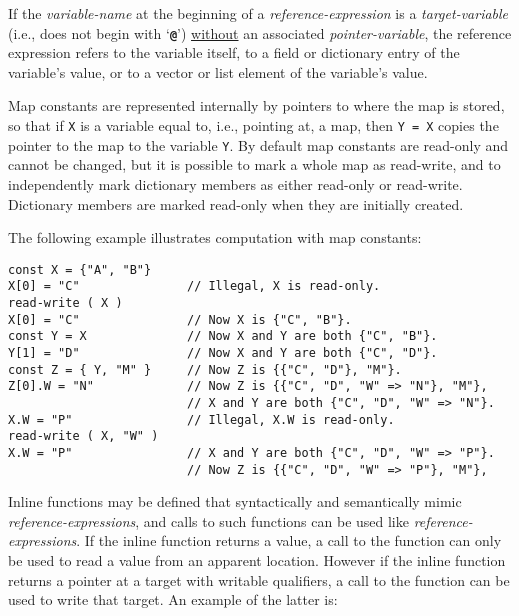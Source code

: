 \documentclass[12pt]{article}
\newcommand{\TT}[1]{{\tt \bfseries #1}}
\newcommand{\EOL}{\penalty \exhyphenpenalty}
\newenvironment{indpar}[1][0.3in]%
	{\begin{list}{}%
		     {\setlength{\itemsep}{0in}%
		      \setlength{\topsep}{0in}%
		      \setlength{\parsep}{1ex}%
		      \setlength{\labelwidth}{#1}%
		      \setlength{\leftmargin}{#1}%
		      \addtolength{\leftmargin}{\labelsep}}%
	 \item}%
	{\end{list}}
\begin{document}
If the {\em variable-name} at the beginning of a {\em reference-expression}
is a {\em target-variable} (i.e., does not begin with `\TT{@}')
\underline{without}
an associated {\em pointer-variable},
the reference expression refers to the variable itself,
to a field or dictionary entry of the variable's value,
or to a vector or list element of the variable's value.

Map constants are represented internally by pointers to where
the map is stored, so that if {\tt X} is a variable equal to,
i.e., pointing at, a map, then {\tt Y = X} copies the pointer
to the map to the variable {\tt Y}.  By default map constants
are read-only and cannot be changed, but it is possible to mark
a whole map as read-write, and to independently mark dictionary members
as either read-only or read-write.
Dictionary members are marked read-only when they are initially created.

The following example illustrates
computation with map constants:
\begin{indpar}\begin{verbatim}
const X = {"A", "B"}
X[0] = "C"               // Illegal, X is read-only.
read-write ( X )
X[0] = "C"               // Now X is {"C", "B"}.
const Y = X              // Now X and Y are both {"C", "B"}. 
Y[1] = "D"               // Now X and Y are both {"C", "D"}. 
const Z = { Y, "M" }     // Now Z is {{"C", "D"}, "M"}.
Z[0].W = "N"             // Now Z is {{"C", "D", "W" => "N"}, "M"},
                         // X and Y are both {"C", "D", "W" => "N"}.
X.W = "P"                // Illegal, X.W is read-only.
read-write ( X, "W" )
X.W = "P"                // X and Y are both {"C", "D", "W" => "P"}.
                         // Now Z is {{"C", "D", "W" => "P"}, "M"},
\end{verbatim}\end{indpar}


Inline functions may be defined that syntactically and semantically mimic
{\em reference-\EOL expres\-sions}, and calls to such functions
can be used like {\em reference-expressions}.
If the inline function returns a value, a call to the function
can only be used to read a value from an apparent
location.  However if the inline function returns a pointer at a target
with writable qualifiers, a call to the function can be used
to write that target.  An example of the latter is:
\label{REFERENCE-EXPRESSION-FUNCTION-EXAMPLE}
\end{document}
